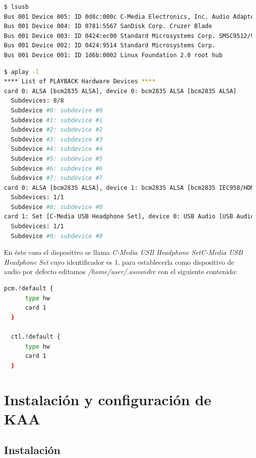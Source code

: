 \begin{lstlisting}[language=bash,caption={Comprobano que el dispositivo es reconocido},label={lst:pi3}]
$ lsusb
Bus 001 Device 005: ID 0d8c:000c C-Media Electronics, Inc. Audio Adapter
Bus 001 Device 004: ID 0781:5567 SanDisk Corp. Cruzer Blade
Bus 001 Device 003: ID 0424:ec00 Standard Microsystems Corp. SMSC9512/9514 Fast Ethernet Adapter
Bus 001 Device 002: ID 0424:9514 Standard Microsystems Corp.
Bus 001 Device 001: ID 1d6b:0002 Linux Foundation 2.0 root hub
\end{lstlisting}

\begin{lstlisting}[language=bash,caption={Identificando los dispositivos de sonido disponibles en el sistema},label={lst:pi4}]
$ aplay -l
**** List of PLAYBACK Hardware Devices ****
card 0: ALSA [bcm2835 ALSA], device 0: bcm2835 ALSA [bcm2835 ALSA]
  Subdevices: 8/8
  Subdevice #0: subdevice #0
  Subdevice #1: subdevice #1
  Subdevice #2: subdevice #2
  Subdevice #3: subdevice #3
  Subdevice #4: subdevice #4
  Subdevice #5: subdevice #5
  Subdevice #6: subdevice #6
  Subdevice #7: subdevice #7
card 0: ALSA [bcm2835 ALSA], device 1: bcm2835 ALSA [bcm2835 IEC958/HDMI]
  Subdevices: 1/1
  Subdevice #0: subdevice #0
card 1: Set [C-Media USB Headphone Set], device 0: USB Audio [USB Audio]
  Subdevices: 1/1
  Subdevice #0: subdevice #0
	\end{lstlisting}

\bigskip

En éste caso el dispositivo se llama \textit{C-Media USB Headphone SetC-Media USB Headphone Set} cuyo identificador es 1, para establecerla como dispositivo de audio por defecto editamos \textit{/home/user/.asoundrc} con el siguiente contenido:


\begin{lstlisting}[language=bash,caption={Comprobano que el dispositivo es reconocido},label={lst:pi5}]
    pcm.!default {
      type hw
      card 1
  }

  ctl.!default {
      type hw
      card 1
  }
\end{lstlisting}

\section{Instalación y configuración de KAA}

\subsection{Instalación}

